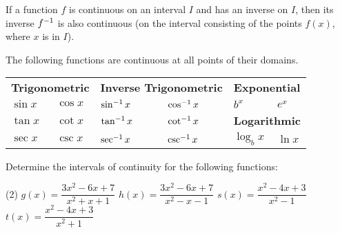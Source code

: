\documentclass[mathNotesPreamble]{subfiles}
\begin{document}
  \begin{thmBox*}
    If a function $f$ is continuous on an interval $I$ and has an inverse on $I$, then its inverse $f^{-1}$ is also continuous (on the interval consisting of the points $f(x)$, where $x$ is in $I$).
  \end{thmBox*}

  \vspace*{15pt}
  \begin{thmBox*}
    The following functions are continuous at all points of their domains.
    
    \begin{tabularx}{\linewidth}{*{6}{X}}
      \multicolumn{2}{L}{\textbf{Trigonometric}}& 
      \multicolumn{2}{L}{\textbf{Inverse Trigonometric}}& 
      \multicolumn{2}{L}{\textbf{Exponential}}\\
      $\sin x$& $\cos x$& $\sin^{-1} x$& $\cos^{-1} x$& $b^x$& $e^x$\\
      $\tan x$& $\cot x$& $\tan^{-1} x$& $\cot^{-1} x$& 
      \multicolumn{2}{L}{\textbf{Logarithmic}}\\
      $\sec x$& $\csc x$& $\sec^{-1} x$& $\csc^{-1} x$& $\log_b x$& $\ln x$
    \end{tabularx}
  \end{thmBox*}
  
  \begin{ex*}
    Determine the intervals of continuity for the following functions:
  \end{ex*}
  \begin{tasks}[after-item-skip=\stretch{1}](2)
    \task $g(x)=\dfrac{3x^2-6x+7}{x^2+x+1}$
    \task $h(x)=\dfrac{3x^2-6x+7}{x^2-x-1}$
    \task $s(x)=\dfrac{x^2-4x+3}{x^2-1}$
    \task $t(x)=\dfrac{x^2-4x+3}{x^2+1}$
  \end{tasks}
  \pagebreak
  
\end{document}
